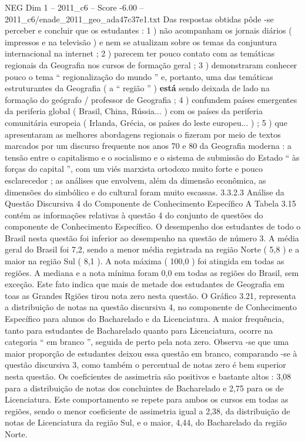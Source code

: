 \begin{textsample}{NEG Dim 1 – 2011\_c6 – Score -6.00 – 2011\_c6/enade\_2011\_geo\_ada47c37e1.txt}
Das respostas obtidas pôde -se perceber e concluir que os estudantes : 1 ) não acompanham os jornais diários ( impressos e na televisão ) e nem se atualizam sobre os temas da conjuntura internacional na internet ; 2 ) parecem ter pouco contato com as temáticas regionais da Geografia nos cursos de formação geral ; 3 ) demonstraram conhecer pouco o tema “ regionalização do mundo ” e, portanto, uma das temáticas estruturantes da Geografia ( a “ região ” ) \textbf{está} sendo deixada de lado na formação do geógrafo / professor de Geografia ; 4 ) confundem países emergentes da periferia global ( Brasil, China, Rússia... ) com os países da periferia comunitária europeia ( Irlanda, Grécia, os países do leste europeu... ) ; 5 ) que apresentaram as melhores abordagens regionais o fizeram por meio de textos marcados por um discurso frequente nos anos 70 e 80 da Geografia moderna : a tensão entre o capitalismo e o socialismo e o sistema de submissão do Estado “ às forças do capital ”, com um viés marxista ortodoxo muito forte e pouco esclarecedor ; as análises que envolvem, além da dimensão econômica, as dimensões do simbólico e do cultural foram muito escassas. 3.3.2.3 Análise da Questão Discursiva 4 do Componente de Conhecimento Específico A Tabela 3.15 contém as informações relativas à questão 4 do conjunto de questões do componente de Conhecimento Específico.
O desempenho dos estudantes de todo o Brasil nesta questão foi inferior ao desempenho na questão de número 3.
A média geral do Brasil foi 7,2, sendo a menor média registrada na região Norte ( 5,8 ) e a maior na região Sul ( 8,1 ).
A nota máxima ( 100,0 ) foi atingida em todas as regiões.
A mediana e a nota mínima foram 0,0 em todas as regiões do Brasil, sem exceção.
Este fato indica que mais de metade dos estudantes de Geografia em toas as Grandes Rgiões tirou nota zero nesta questão.
O Gráfico 3.21, representa a distribuição de notas na questão discursiva 4, no componente de Conhecimento Específico para alunos do Bacharelado e da Licenciatura.
A maior frequência, tanto para estudantes de Bacharelado quanto para Licenciatura, ocorre na categoria “ em branco ”, seguida de perto pela nota zero.
Observa -se que uma maior proporção de estudantes deixou essa questão em branco, comparando -se à questão discursiva 3, como também o percentual de notas zero é bem superior nesta questão.
Os coeficientes de assimetria são positivos e bastante altos : 3,08 para a distribuição de notas dos concluintes de Bacharelado e 2,75 para os de Licenciatura.
Este comportamento se repete para ambos os cursos em todas as regiões, sendo o menor coeficiente de assimetria igual a 2,38, da distribuição de notas de Licenciatura da região Sul, e o maior, 4,44, do Bacharelado da região Norte.

\end{textsample}

